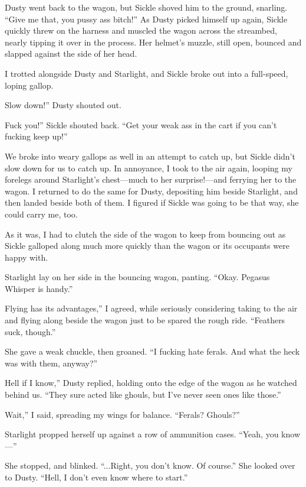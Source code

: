 Dusty went back to the wagon, but Sickle shoved him to the ground, snarling. “Give me that, you pussy ass bitch!” As Dusty picked himself up again, Sickle quickly threw on the harness and muscled the wagon across the streambed, nearly tipping it over in the process. Her helmet’s muzzle, still open, bounced and slapped against the side of her head.

I trotted alongside Dusty and Starlight, and Sickle broke out into a full-speed, loping gallop.

\leavevmode{}Slow down!” Dusty shouted out.

\leavevmode{}Fuck you!” Sickle shouted back. “Get your weak ass in the cart if you can’t fucking keep up!”

We broke into weary gallops as well in an attempt to catch up, but Sickle didn’t slow down for us to catch up. In annoyance, I took to the air again, looping my forelegs around Starlight’s chest—much to her surprise!—and ferrying her to the wagon. I returned to do the same for Dusty, depositing him beside Starlight, and then landed beside both of them. I figured if Sickle was going to be that way, she could carry me, too.

As it was, I had to clutch the side of the wagon to keep from bouncing out as Sickle galloped along much more quickly than the wagon or its occupants were happy with.

Starlight lay on her side in the bouncing wagon, panting. “Okay. Pegasus Whisper is handy.”

\leavevmode{}Flying has its advantages,” I agreed, while seriously considering taking to the air and flying along beside the wagon just to be spared the rough ride. “Feathers suck, though.”

She gave a weak chuckle, then groaned. “I fucking hate ferals. And what the heck was with them, anyway?”

\leavevmode{}Hell if I know,” Dusty replied, holding onto the edge of the wagon as he watched behind us. “They sure acted like ghouls, but I’ve never seen ones like those.”

\leavevmode{}Wait,” I said, spreading my wings for balance. “Ferals? Ghouls?”

Starlight propped herself up against a row of ammunition cases. “Yeah, you know—”

She stopped, and blinked. “...Right, you don’t know. Of course.” She looked over to Dusty. “Hell, I don’t even know where to start.”

